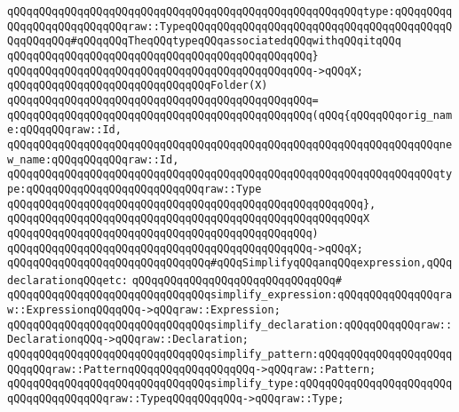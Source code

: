 \verb|qQQqqQQqqQQqqQQqqQQqqQQqqQQqqQQqqQQqqQQqqQQqqQQqqQQqqQQqtype:qQQqqQQqqQQqqQQqqQQqqQQqqQQqraw::TypeqQQqqQQqqQQqqQQqqQQqqQQqqQQqqQQqqQQqqQQqqQQqqQQqqQQq#qQQqqQQqTheqQQqtypeqQQqassociatedqQQqwithqQQqitqQQq|\newline
\verb|qQQqqQQqqQQqqQQqqQQqqQQqqQQqqQQqqQQqqQQqqQQqqQQq}|\newline
\verb|qQQqqQQqqQQqqQQqqQQqqQQqqQQqqQQqqQQqqQQqqQQqqQQq->qQQqX;|\newline
\newline
\verb|qQQqqQQqqQQqqQQqqQQqqQQqqQQqqQQqFolder(X)|\newline
\verb|qQQqqQQqqQQqqQQqqQQqqQQqqQQqqQQqqQQqqQQqqQQqqQQq=|\newline
\verb|qQQqqQQqqQQqqQQqqQQqqQQqqQQqqQQqqQQqqQQqqQQqqQQq(qQQq{qQQqqQQqorig_name:qQQqqQQqraw::Id,|\newline
\verb|qQQqqQQqqQQqqQQqqQQqqQQqqQQqqQQqqQQqqQQqqQQqqQQqqQQqqQQqqQQqqQQqqQQqnew_name:qQQqqQQqqQQqraw::Id,|\newline
\verb|qQQqqQQqqQQqqQQqqQQqqQQqqQQqqQQqqQQqqQQqqQQqqQQqqQQqqQQqqQQqqQQqqQQqtype:qQQqqQQqqQQqqQQqqQQqqQQqqQQqraw::Type|\newline
\verb|qQQqqQQqqQQqqQQqqQQqqQQqqQQqqQQqqQQqqQQqqQQqqQQqqQQqqQQq},|\newline
\verb|qQQqqQQqqQQqqQQqqQQqqQQqqQQqqQQqqQQqqQQqqQQqqQQqqQQqqQQqX|\newline
\verb|qQQqqQQqqQQqqQQqqQQqqQQqqQQqqQQqqQQqqQQqqQQqqQQq)|\newline
\verb|qQQqqQQqqQQqqQQqqQQqqQQqqQQqqQQqqQQqqQQqqQQqqQQq->qQQqX;|\newline
\newline
\newline
\verb|qQQqqQQqqQQqqQQqqQQqqQQqqQQqqQQq#qQQqSimplifyqQQqanqQQqexpression,qQQqdeclarationqQQqetc:|\newline
\verb|qQQqqQQqqQQqqQQqqQQqqQQqqQQqqQQq#|\newline
\verb|qQQqqQQqqQQqqQQqqQQqqQQqqQQqqQQqsimplify_expression:qQQqqQQqqQQqqQQqraw::ExpressionqQQqqQQq->qQQqraw::Expression;|\newline
\verb|qQQqqQQqqQQqqQQqqQQqqQQqqQQqqQQqsimplify_declaration:qQQqqQQqqQQqraw::DeclarationqQQq->qQQqraw::Declaration;|\newline
\verb|qQQqqQQqqQQqqQQqqQQqqQQqqQQqqQQqsimplify_pattern:qQQqqQQqqQQqqQQqqQQqqQQqqQQqraw::PatternqQQqqQQqqQQqqQQqqQQq->qQQqraw::Pattern;|\newline
\verb|qQQqqQQqqQQqqQQqqQQqqQQqqQQqqQQqsimplify_type:qQQqqQQqqQQqqQQqqQQqqQQqqQQqqQQqqQQqqQQqraw::TypeqQQqqQQqqQQq->qQQqraw::Type;|\newline
